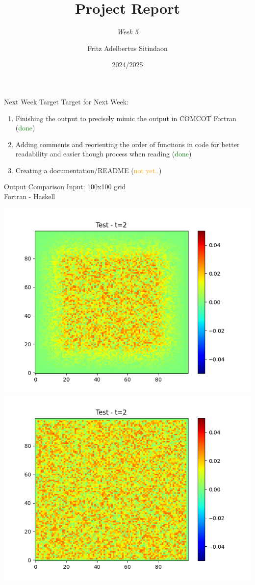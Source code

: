 \documentclass{beamer}
\title{Project Report}
\subtitle{\textit{Week 5}}
\date[]{2024/2025}
\author[Fritz]{Fritz Adelbertus Sitindaon}
\begin{document}
\begin{frame}
\titlepage
\end{frame}

\begin{frame}{Next Week Target}
    Target for Next Week:
    \begin{enumerate}
        \item Finishing the output to precisely mimic the output in COMCOT Fortran (\textcolor{green}{done})
        \item Adding comments and reorienting the order of functions in code for  
        better readability and easier though process when reading (\textcolor{green}{done})
        \item Creating a documentation/README (\textcolor{orange}{not yet..})
    \end{enumerate}
\end{frame}

\begin{frame}{Output Comparison}
    Input: 100x100 grid\\
    Fortran - Haskell
    \begin{center}
        \includegraphics[scale=0.32]{figure/frame_2.png}
        \includegraphics[scale=0.32]{figure/frame_2_2.png}
    \end{center}
\end{frame}
\end{document}
